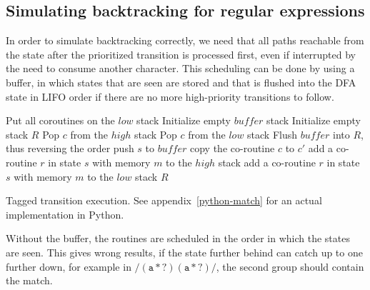 \documentclass[11pt,a4paper,twoside,openright]{Thesis}
\theoremstyle{definition}
\newcommand{\regex}[1]{\ensuremath{\mathtt{/#1/}}}
\newcommand{\seclabel}[1]{\label{sec:#1}}
\begin{document}
\subsection{Simulating backtracking for regular expressions}\seclabel{tfsm}

In order to simulate backtracking correctly, we need that all paths reachable 
from the state after the prioritized transition is processed first, even if
interrupted by the need to consume another character. This scheduling can be
done by using a buffer, in which states that are seen are stored and that is
flushed into the DFA state in LIFO order if there are no more high-priority
transitions to follow.

\begin{algorithm*}
  \begin{algorithmic}
    \State Put all coroutines on the $low$ stack
    \State Initialize empty $buffer$ stack
    \State Initialize empty stack $R$
        \State Pop $c$ from the $high$ stack
      \Else
        \State Pop $c$ from the $low$ stack
        \State Flush $buffer$ into $R$, thus reversing the order
      \EndIf
        \State push $s$ to $buffer$
      \EndFor
          \State copy the co-routine $c$ to $c'$
          \State {}
        \EndIf
          \State add a co-routine $r$ in state $s$ with memory $m$ to the 
          $high$ stack
        \Else
          \State add a co-routine $r$ in state $s$ with memory $m$ to the 
          $low$ stack
        \EndIf
      \EndFor
    \EndWhile
    \Return $R$
  \EndFunction
  \end{algorithmic}
  \caption{\label{alg:coroutine-tagged}Tagged transition execution. See 
  appendix~\ref{python-match} for an actual implementation in Python.}
\end{algorithm*}

Without the buffer, the routines are scheduled in the order in which the 
states are seen. This gives wrong results, if the state further behind can 
catch up to one further down, for example in \regex{(a*?)(a*?)}, the second 
group should contain the match.
\end{document}
